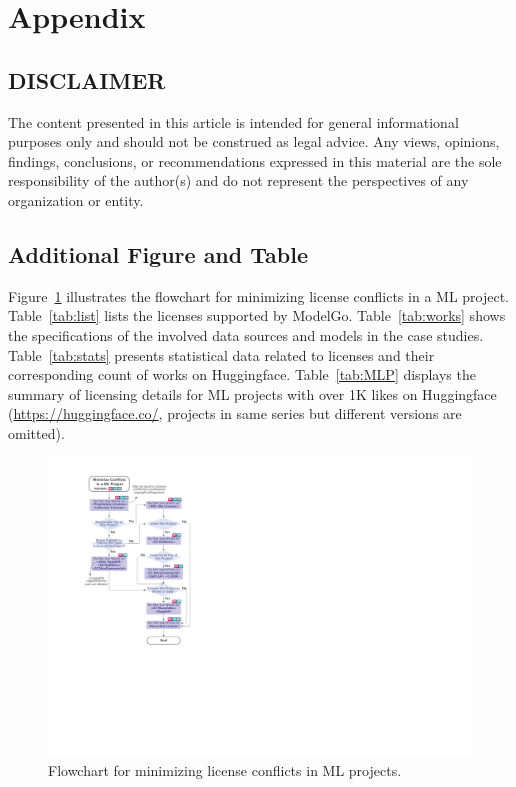 \section{Appendix}

\subsection{DISCLAIMER}
\label{apdx:disclaimer}
The content presented in this article is intended for general informational purposes only and should not be construed as legal advice. Any views, opinions, findings, conclusions, or recommendations expressed in this material are the sole responsibility of the author(s) and do not represent the perspectives of any organization or entity.

\subsection{Additional Figure and Table}
\label{apdx:A}

Figure~\ref{fig:flowchart} illustrates the flowchart for minimizing license conflicts in a ML project.
Table~\ref{tab:list} lists the licenses supported by ModelGo.
Table~\ref{tab:works} shows the specifications of the involved data sources and models in the case studies.
Table~\ref{tab:stats} presents statistical data related to licenses and their corresponding count of works on Huggingface.
Table~\ref{tab:MLP} displays the summary of licensing details for ML projects with over 1K likes on Huggingface (\url{https://huggingface.co/}, projects in same series but different versions are omitted).

\begin{figure}[H]
  \centering
  \includegraphics[scale=1]{fig/flowchart.pdf}
  \caption{Flowchart for minimizing license conflicts in ML projects.}
  \Description{}
  \label{fig:flowchart}
\end{figure}

